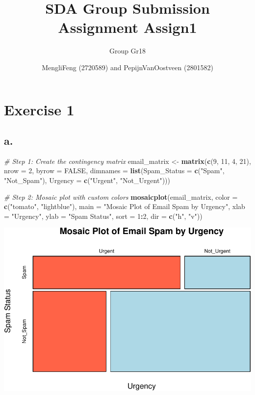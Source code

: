 \documentclass[
]{article}
\title{SDA Group Submission Assignment Assign1}
\subtitle{Group Gr18}
\author{MengliFeng (2720589) and PepijnVanOostveen (2801582)}
\date{}
\newenvironment{Shaded}{\begin{snugshade}}{\end{snugshade}}
\newcommand{\AttributeTok}[1]{\textcolor[rgb]{0.13,0.29,0.53}{#1}}
\newcommand{\CommentTok}[1]{\textcolor[rgb]{0.56,0.35,0.01}{\textit{#1}}}
\newcommand{\ConstantTok}[1]{\textcolor[rgb]{0.56,0.35,0.01}{#1}}
\newcommand{\DecValTok}[1]{\textcolor[rgb]{0.00,0.00,0.81}{#1}}
\newcommand{\FunctionTok}[1]{\textcolor[rgb]{0.13,0.29,0.53}{\textbf{#1}}}
\newcommand{\NormalTok}[1]{#1}
\newcommand{\OtherTok}[1]{\textcolor[rgb]{0.56,0.35,0.01}{#1}}
\newcommand{\SpecialCharTok}[1]{\textcolor[rgb]{0.81,0.36,0.00}{\textbf{#1}}}
\newcommand{\StringTok}[1]{\textcolor[rgb]{0.31,0.60,0.02}{#1}}
\begin{document}
\maketitle

\section{Exercise 1}\label{exercise-1}

\subsection{a.}\label{a.}

\begin{Shaded}
\begin{Highlighting}[]
\CommentTok{\# Step 1: Create the contingency matrix}
\NormalTok{email\_matrix }\OtherTok{\textless{}{-}} \FunctionTok{matrix}\NormalTok{(}\FunctionTok{c}\NormalTok{(}\DecValTok{9}\NormalTok{, }\DecValTok{11}\NormalTok{, }\DecValTok{4}\NormalTok{, }\DecValTok{21}\NormalTok{), }\AttributeTok{nrow =} \DecValTok{2}\NormalTok{, }\AttributeTok{byrow =} \ConstantTok{FALSE}\NormalTok{,}
                       \AttributeTok{dimnames =} \FunctionTok{list}\NormalTok{(}\AttributeTok{Spam\_Status =} \FunctionTok{c}\NormalTok{(}\StringTok{"Spam"}\NormalTok{, }\StringTok{"Not\_Spam"}\NormalTok{),}
                                       \AttributeTok{Urgency =} \FunctionTok{c}\NormalTok{(}\StringTok{"Urgent"}\NormalTok{, }\StringTok{"Not\_Urgent"}\NormalTok{)))}

\CommentTok{\# Step 2: Mosaic plot with custom colors}
\FunctionTok{mosaicplot}\NormalTok{(email\_matrix, }\AttributeTok{color =} \FunctionTok{c}\NormalTok{(}\StringTok{"tomato"}\NormalTok{, }\StringTok{"lightblue"}\NormalTok{), }
           \AttributeTok{main =} \StringTok{"Mosaic Plot of Email Spam by Urgency"}\NormalTok{,}
           \AttributeTok{xlab =} \StringTok{"Urgency"}\NormalTok{, }\AttributeTok{ylab =} \StringTok{"Spam Status"}\NormalTok{, }
           \AttributeTok{sort =} \DecValTok{1}\SpecialCharTok{:}\DecValTok{2}\NormalTok{, }\AttributeTok{dir =} \FunctionTok{c}\NormalTok{(}\StringTok{"h"}\NormalTok{, }\StringTok{"v"}\NormalTok{))}
\end{Highlighting}
\end{Shaded}

\includegraphics{SDA_A6_files/figure-latex/unnamed-chunk-1-1.pdf}
\end{document}
